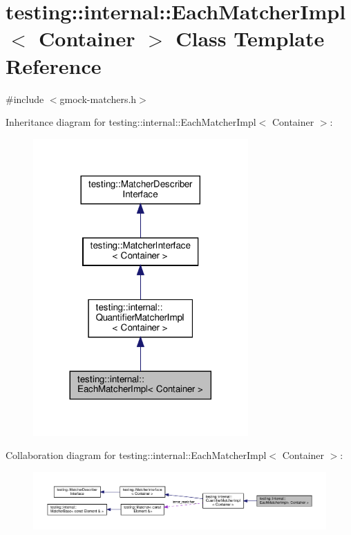 \hypertarget{classtesting_1_1internal_1_1_each_matcher_impl}{}\section{testing\+:\+:internal\+:\+:Each\+Matcher\+Impl$<$ Container $>$ Class Template Reference}
\label{classtesting_1_1internal_1_1_each_matcher_impl}


{\ttfamily \#include $<$gmock-\/matchers.\+h$>$}



Inheritance diagram for testing\+:\+:internal\+:\+:Each\+Matcher\+Impl$<$ Container $>$\+:
\nopagebreak
\begin{figure}[H]
\begin{center}
\leavevmode
\includegraphics[width=233pt]{classtesting_1_1internal_1_1_each_matcher_impl__inherit__graph}
\end{center}
\end{figure}


Collaboration diagram for testing\+:\+:internal\+:\+:Each\+Matcher\+Impl$<$ Container $>$\+:
\nopagebreak
\begin{figure}[H]
\begin{center}
\leavevmode
\includegraphics[width=350pt]{classtesting_1_1internal_1_1_each_matcher_impl__coll__graph}
\end{center}
\end{figure}

